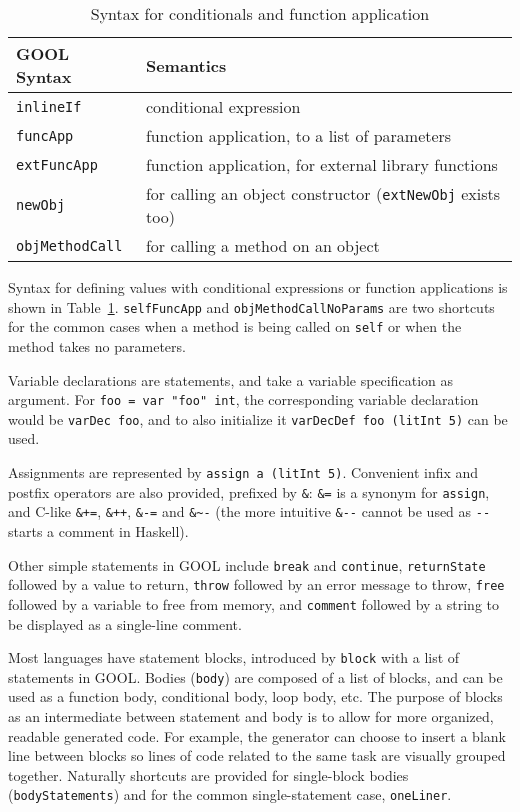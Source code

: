 \documentclass[sigplan,review,anonymous,prologue,dvipsnames]{acmart}
\begin{document}
\begin{table}[!h]
  \caption{Syntax for conditionals and function application}
  \begin{tabular}{p{} p{}}
    \textbf{GOOL Syntax} & \textbf{Semantics} \\
    \midrule
    \verb|inlineIf| & conditional expression \\
    \verb|funcApp| & function application, to a list of parameters \\
    \verb|extFuncApp| & function application, for external library 
    functions\\
    \verb|newObj| & for calling an object constructor (\verb|extNewObj| 
    exists too) \\
    \verb|objMethodCall| & for calling a method on an object \\
  \end{tabular}
  \label{tab:values}
\end{table}

Syntax for defining values with conditional expressions or function 
applications is shown in Table~\ref{tab:values}. \verb|selfFuncApp| and 
\verb|objMethodCallNoParams| are two shortcuts for the common cases when a 
method is being called on \verb|self| or when the method takes no parameters. 

Variable declarations are statements, and take a variable specification
as argument. For \verb|foo = var "foo" int|, the corresponding variable
declaration would be \verb|varDec foo|, and to also initialize it
\verb|varDecDef foo (litInt 5)| can be used. 

Assignments are represented by \verb|assign a (litInt 5)|. Convenient
infix and postfix operators are also provided, prefixed by \verb|&|:
\verb|&=| is a synonym for \verb|assign|, and C-like 
\verb|&+=|, \verb|&++|, \verb|&-=| and \verb|&~-| (the more intuitive
\verb|&--| cannot be used as \verb|--| starts a comment in Haskell).

Other simple statements in GOOL include \verb|break| and \verb|continue|, 
\verb|returnState| followed by a value to return, \verb|throw| followed by an 
error message to throw, \verb|free| followed by a variable to free from
memory, and \verb|comment| followed by a string to be displayed as a 
single-line comment.

Most languages have statement blocks, introduced by \verb|block| with
a list of statements in GOOL. Bodies (\verb|body|) are composed
of a list of blocks, and can be used as a function body, conditional body, loop
body, etc. The purpose of blocks as an intermediate between statement and body
is to allow for more organized, readable generated code. For example, the
generator can choose to insert a blank line between blocks so lines of code
related to the same task are visually grouped together. Naturally shortcuts
are provided for single-block bodies (\verb|bodyStatements|) and
for the common single-statement case, \verb|oneLiner|. 
 
\end{document}
